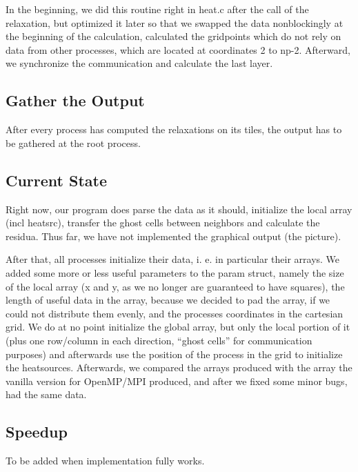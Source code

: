 In the beginning, we did this routine right in heat.c after the call of the relaxation, but optimized it later so that we swapped the data nonblockingly at the beginning of the calculation, calculated the gridpoints which do not rely on data from other processes, which are located at coordinates 2 to np-2. Afterward, we synchronize the communication and calculate the last layer.

\subsection*{Gather the Output}

After every process has computed the relaxations on its tiles, the output has to be gathered at the root process.

\subsection*{Current State}
Right now, our program does parse the data as it should, initialize the local array (incl heatsrc), transfer the ghost cells between neighbors and calculate the residua. Thus far, we have not implemented the graphical output (the picture).

After that, all processes initialize their data, i. e. in particular their arrays. We added some more or less useful parameters to the param struct, namely the size of the local array (x and y, as we no longer are guaranteed to have squares), the length of useful data in the array, because we decided to pad the array, if we could not distribute them evenly, and the processes coordinates in the cartesian grid. We do at no point initialize the global array, but only the local portion of it (plus one row/column in each direction, ``ghost cells'' for communication purposes) and afterwards use the position of the process in the grid to initialize the heatsources. Afterwards, we compared the arrays produced with the array the vanilla version for OpenMP/MPI produced, and after we fixed some minor bugs, had the same data.





\subsection*{Speedup}

To be added when implementation fully works.

